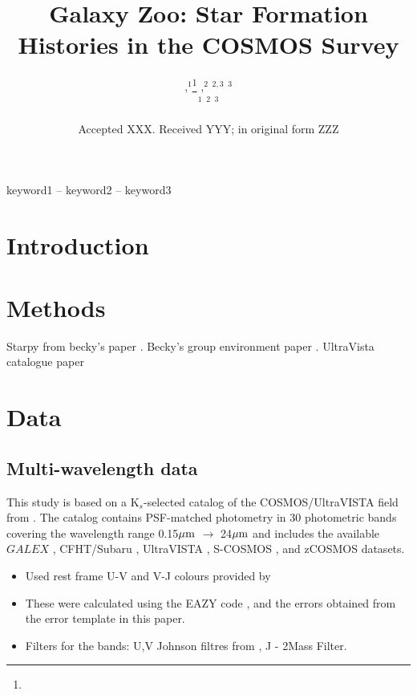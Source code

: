 \documentclass[a4paper,fleqn,usenatbib]{mnras}
\title[COSMOS SFHs]{Galaxy Zoo: Star Formation Histories in the COSMOS Survey}
\author[]{
,$^{1}$\thanks{}
,$^{2}$
$^{2,3}$
$^{3}$
\\
$^{1}$
$^{2}$
$^{3}$
}
\date{Accepted XXX. Received YYY; in original form ZZZ}
\begin{document}
\label{firstpage}
\pagerange{\pageref{firstpage}--\pageref{lastpage}}
\maketitle

\begin{abstract}


\end{abstract}

\begin{keywords}
keyword1 -- keyword2 -- keyword3
\end{keywords}



\section{Introduction}

\section{Methods}

Starpy from becky's paper \cite{smethurst2015galaxy}.
Becky's group environment paper \cite{smethurst2017galaxy}.
UltraVista catalogue paper \cite{muzzin2013public}
\section{Data}
   
   \subsection{Multi-wavelength data}
   
   This study is based on a K$_{s}$-selected catalog of the COSMOS/UltraVISTA field from \cite{muzzin2013public}.  
   The catalog contains PSF-matched photometry in 30 photometric bands covering the wavelength range 0.15$\hbox{$\mu$m}$ 
   $\rightarrow$ 24$\hbox{$\mu$m}$ and includes the available $GALEX$ \citep{martin2005}, CFHT/Subaru \citep{capak2007}, 
   UltraVISTA \citep{mcCraken2012}, S-COSMOS \citep{sanders2007}, and zCOSMOS \citep{lilly2009} datasets.

   \begin{itemize}
   
   \item Used rest frame U-V and V-J colours provided by \cite{muzzin2013public}
   \item These were calculated using the EAZY code \cite{eazycode}, and the errors obtained from the error template in this paper.
   \item Filters for the bands: U,V Johnson filtres from \cite{maiz2006}, J - 2Mass Filter.
   \end{itemize}
\end{document}

